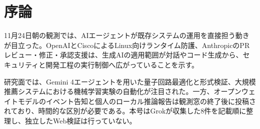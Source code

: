 \section{序論}
11月24日朝の観測では、AIエージェントが既存システムの運用を直接担う動きが目立った。OpenAIとCiscoによるLinux向けランタイム防護、AnthropicのPRレビュー・修正・承認支援は、生成AIの適用範囲が対話やコード生成から、セキュリティと開発工程の実行制御へ広がっていることを示す。

研究面では、Gemini 4エージェントを用いた量子回路最適化と形式検証、大規模推薦システムにおける機械学習実験の自動化が注目された。一方、オープンウェイトモデルのイベント告知と個人のローカル推論報告は観測窓の終了後に投稿されており、時間的な区別が必要である。本号はGrokが収集した8件を記載順に整理し、独立したWeb検証は行っていない。
